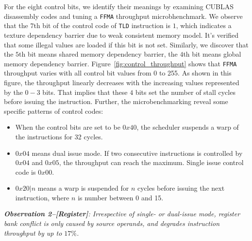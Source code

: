 For the eight control bits, we identify their meanings by examining CUBLAS disassembly codes and tuning a {\tt FFMA}
throughput microbhenchmark. We observe that the $7$th bit of the control code of {\tt TLD} instruction is $1$, which
indicates a texture dependency barrier due to weak consistent memory model. It's verified that some illegal values are
loaded if this bit is not set. Similarly, we discover that the $5$th bit means shared memory dependency barrier, the
$4$th bit means global memory dependency barrier. Figure~\ref{fig:control_throughput} shows that {\tt FFMA} throughput varies with all control bit values from 0 to 255. As shown in this figure, the throughput linearly decreases with the increasing values represented by the $0-3$ bits. That implies that these $4$ bits set the number of stall cycles before issuing the instruction. Further, the microbenchmarking reveal some specific patterns of control codes:

\begin{itemize}
\item When the control bits are set to be $0x40$, the scheduler suspends a warp of the instructions for 32 cycles.
\item $0x04$ means dual issue mode. If two consecutive instructions is controlled by $0x04$ and $0x05$, the throughput can reach the maximum. Single issue control code is $0x00$.
\item $0x20|n$ means a warp is suspended for $n$ cycles before issuing the next instruction, where $n$ is number between 0 and 15.
\end{itemize}


{\em {\bf Observation 2--[Register]}: Irrespective of single- or dual-issue mode, register bank conflict is only caused by source operands, and degrades instruction throughput by up to $17\%$.}

